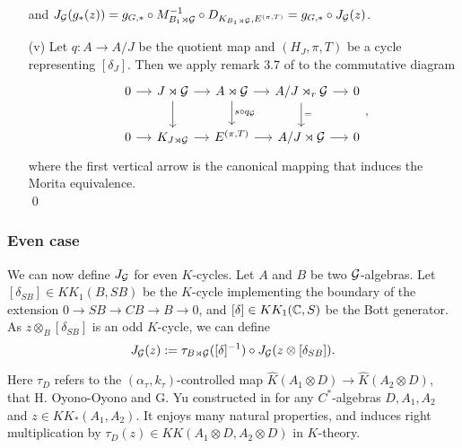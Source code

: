 \begin{dem}
\begin{enumerate}
and $J_\mathcal G(g_*(z))= g_{G,*}\circ M_{B_1\rtimes\mathcal G}^{-1}\circ D_{K_{B_1\rtimes \mathcal G},E^{(\pi,T)}}=g_{G,*}\circ J_\mathcal G(z)$.\\
\item[(v)] Let $q:A\rightarrow A/J$ be the quotient map and $(H_J, \pi, T)$ be a cycle representing $[\delta_J]$. Then we apply remark $3.7$ of \cite{OY2} to the commutative diagram
\[\begin{tikzcd}[column sep = small]
0\arrow{r} & J\rtimes \G\arrow{r}\arrow{d} & A\rtimes \G \arrow{r}\arrow{d}{s\circ q_\G}& A/J\rtimes_r \G\arrow{r}\arrow{d}{=} & 0\\
0\arrow{r} & K_{J\rtimes \G}\arrow{r} & E^{(\pi,T)} \arrow{r}& A/J\rtimes \G\arrow{r} & 0
\end{tikzcd},\]
where the first vertical arrow is the canonical mapping that induces the Morita equivalence. \\
\qed
\end{enumerate}
\end{dem}

\subsubsection{Even case}

We can now define $J_\mathcal G$ for even $K$-cycles. Let $A$ and $B$ be two $\mathcal G$-algebras. Let $[\delta_{SB}]\in KK_1(B,SB)$ be the $K$-cycle implementing the boundary of the extension $0\rightarrow SB\rightarrow CB\rightarrow B\rightarrow 0$, and $[\delta]\in KK_1(\mathbb C,S)$ be the Bott generator. As $z\otimes_B [\delta_{SB}]$ is an odd $K$-cycle, we can define
\[J_\mathcal G(z):= \tau_{B\rtimes \mathcal G}([\delta]^{-1})\circ J_\mathcal G(z\otimes[\delta_{SB}]).\] 

Here $\tau_D$ refers to the $(\alpha_\tau,k_\tau)$-controlled map $\hat K (A_1\otimes D )\rightarrow \hat K(A_2\otimes D)$, that H. Oyono-Oyono and G. Yu constructed in \cite{OY2} for any $C^*$-algebras $D,A_1,A_2$ and $z\in KK_*(A_1,A_2)$. It enjoys many natural properties, and induces right multiplication by $\tau_D(z)\in KK(A_1\otimes D,A_2\otimes D)$ in $K$-theory.\\

